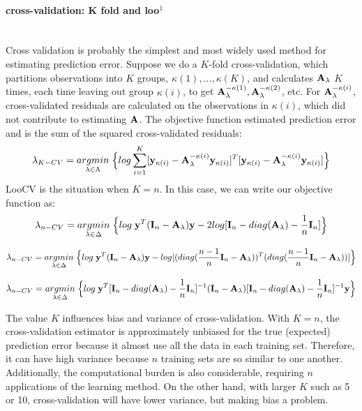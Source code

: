 \documentclass[11pt]{article}
\begin{document}
\paragraph{cross-validation: K fold and loo$^{1}$}\mbox{}\\
Cross validation is probably the simplest and most widely used method for estimating prediction error. Suppose we do a $K$-fold cross-validation, which partitions observations into $K$ groups, $\kappa(1),...,\kappa(K)$, and calculates ${\bf A}_\lambda$ $K$ times, each time leaving out group $\kappa(i)$, to get ${\bf A}_\lambda^{-\kappa(1)}, {\bf A}_\lambda^{-\kappa(2)}$, etc. For ${\bf A}_\lambda^{-\kappa(i)}$, cross-validated residuals are calculated on the observations in $\kappa(i)$, which did not contribute to estimating ${\bf A}$. The objective function estimated prediction error and is the sum of the squared cross-validated residuals:
\begin{align}
\lambda_{K-CV}=\underset{\lambda \in \Lambda}{argmin}\;\Big\{log\sum_{i=1}^K[{\bf y}_{\kappa(i)}-{\bf A}_\lambda^{-\kappa(i)}{\bf y}_{\kappa(i)}]^T[{\bf y}_{\kappa(i)}-{\bf A}_\lambda^{-\kappa(i)}{\bf y}_{\kappa(i)}]\Big\}
\end{align}
LooCV is the situation when $K=n$. In this case, we can write our objective function as:
\begin{align}
\lambda_{n-CV}=\underset{\lambda \in \Delta}{argmin}\;\Big\{log\;{\bf y}^T({\bf I}_n-{\bf A}_\lambda){\bf y}-2log[{\bf I}_n-diag({\bf A}_\lambda)-\frac{1}{n}{\bf I}_n]\Big\}
\end{align}

\begin{align*}
\lambda_{n-CV}=\underset{\lambda \in \Delta}{argmin}\;\Big\{log\;{\bf y}^T({\bf I}_n-{\bf A}_\lambda){\bf y}-log[(diag(\frac{n-1}{n}{\bf I}_n-{\bf A}_\lambda))^T(diag(\frac{n-1}{n}{\bf I}_n-{\bf A}_\lambda))]\Big\}
\end{align*}

\begin{align*}
\lambda_{n-CV}=\underset{\lambda \in \Delta}{argmin}\;\Big\{log\;{\bf y}^T[{\bf I}_n-diag({\bf A}_\lambda)-\frac{1}{n}{\bf I}_n]^{-1}({\bf I}_n-{\bf A}_\lambda)[{\bf I}_n-diag({\bf A}_\lambda)-\frac{1}{n}{\bf I}_n]^{-1}{\bf y}\Big\}
\end{align*}


The value $K$ influences bias and variance of cross-validation. With $K=n$, the cross-validation estimator is approximately unbiased for the true (expected) prediction error because it almost use all the data in each training set. Therefore, it can have high variance because $n$ training sets are so similar to one another. Additionally, the computational burden is also considerable, requiring $n$ applications of the learning method. On the other hand, with larger $K$ such as 5 or 10, cross-validation will have lower variance, but making bias a problem.
\end{document}
